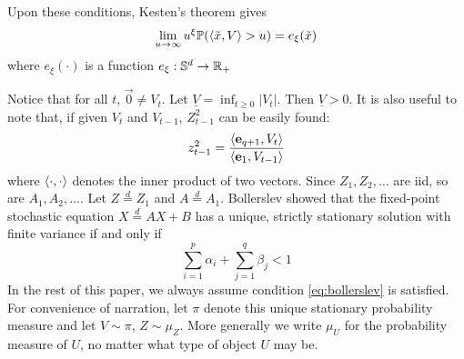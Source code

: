 \documentclass[aoas,preprint]{imsart}
\numberwithin{equation}{section}
\theoremstyle{plain}
\begin{document}
Upon these conditions, Kesten's theorem gives
\[
\lim_{u \to \infty} u^\xi \mathbb{P}(\langle\tilde x, V\rangle > u) = e_\xi(\tilde x)
\]
where $e_\xi(\cdot)$ is a function $e_\xi : \mathbb S^d \to \mathbb R_+$

Notice that for all $t$, $\vec 0 \neq V_t$. Let
$\underline V = \inf_{t \geq 0} |V_t|$. Then $\underline V > 0$. 
It is also useful to note that, if given $V_t$ and $V_{t-1}$,
$Z_{t-1}^2$ can be easily found:
\[
z_{t-1}^2 = {
  \langle\mathbf{e}_{q+1}, V_{t}\rangle
  \over
  \langle\mathbf{e}_1, V_{t-1}\rangle
}
\]
where $\langle\cdot, \cdot\rangle$ denotes the inner product of two vectors.
Since $Z_1, Z_2, \dots$ are iid, so are $A_1, A_2, \dots$.
Let $Z \overset{d}{=} Z_1$ and $A \overset{d}{=} A_1$.
Bollerslev \cite{bollerslev:1986} showed that the fixed-point
stochastic equation $X \overset{d}{=} A X + B$ has a unique, strictly
stationary solution with finite variance if and only if
\begin{equation}
  \sum_{i=1}^p \alpha_i + \sum_{j=1}^q \beta_j < 1
  \label{eq:bollerslev}
\end{equation}
In the rest of this paper, we always assume condition
\eqref{eq:bollerslev} is satisfied. For convenience of narration, let
$\pi$ denote this unique stationary probability measure and let
$V \sim \pi$, $Z \sim \mu_Z$. More generally we write $\mu_U$ for the
probability measure of $U$, no matter what type of object $U$ may be.
\end{document}

